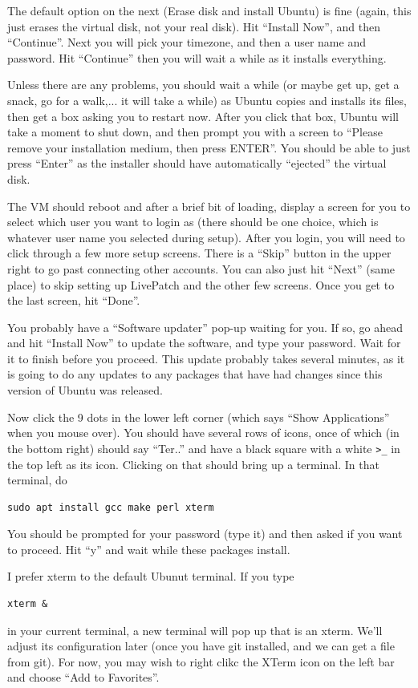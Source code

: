 \documentclass[12pt]{article}
\begin{document}
The default option on the next (Erase disk and install Ubuntu) is fine
(again, this just erases the virtual disk, not your real disk).  Hit
``Install Now'', and then ``Continue''.  Next you will pick your
timezone, and then a user name and password.  Hit ``Continue'' then
you will wait a while as it installs everything.

Unless there are any problems, you should wait a while (or
maybe get up, get a snack, go for a walk,... it will take a while) as Ubuntu
copies and installs its files, then get a box asking you to restart
now.  After you click that box, Ubuntu will take a moment to shut
down, and then prompt you with a screen to ``Please remove your
installation medium, then press ENTER''.  You should be able to just
press ``Enter'' as the installer should have automatically ``ejected''
the virtual disk.

The VM should reboot and after a brief bit of loading, display a
screen for you to select which user you want to login as (there should
be one choice, which is whatever user name you selected during setup).
After you login, you will need to click through a few more setup
screens.  There is a ``Skip'' button in the upper right to go past
connecting other accounts.  You can also just hit ``Next'' (same place)
to skip setting up LivePatch and the other few screens.  Once you get to the last
screen, hit ``Done''.

You probably have a ``Software updater'' pop-up waiting for you. If so, go ahead
and hit ``Install Now'' to update the software, and type your password. Wait for
it to finish before you proceed.  This update probably takes several minutes,
as it is going to do any updates to any packages that have had changes since
this version of Ubuntu was released.  

Now click the 9 dots in the lower left corner (which says ``Show
Applications'' when you mouse over).  You should have several rows
of icons, once of which (in the bottom right) should say ``Ter..'' and
have a black square with a white \verb+>_+ in the top left as its icon.
Clicking on that should bring up a terminal.    In that terminal, do

\begin{verbatim}
sudo apt install gcc make perl xterm
\end{verbatim}
You should be prompted for your password (type it) and then asked if you want
to proceed.  Hit ``y'' and wait while these packages install.  

I prefer xterm to the default Ubunut terminal.  If you type
\begin{verbatim}
xterm &
\end{verbatim}
in your current terminal, a new terminal will pop up that is an xterm.
We'll adjust its configuration later (once you have git installed, and
we can get a file from git).  For now, you may wish to right clikc the
XTerm icon on the left bar and choose ``Add to Favorites''.
\end{document}
